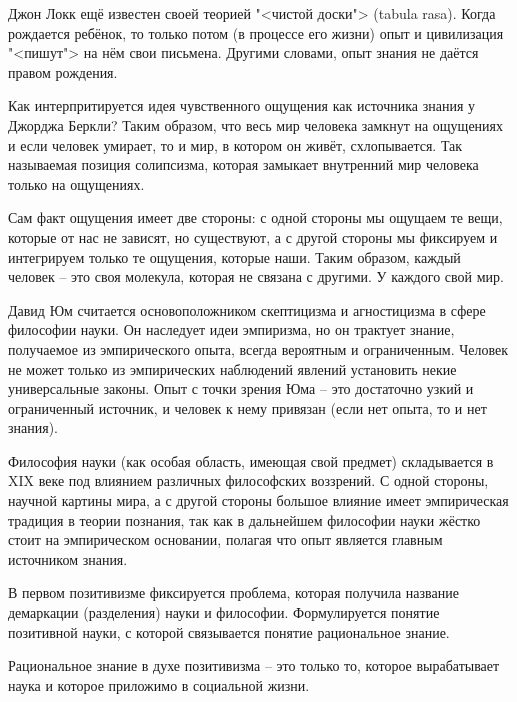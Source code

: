 \documentclass[main.tex]{subfiles}
\begin{document}
Джон Локк ещё известен своей теорией "<чистой доски"> (tabula rasa).
Когда рождается ребёнок, то только потом (в процессе его жизни) опыт и цивилизация "<пишут"> на нём свои письмена.
Другими словами, опыт знания не даётся правом рождения.

Как интерпритируется идея чувственного ощущения как источника знания у Джорджа Беркли?
Таким образом, что весь мир человека замкнут на ощущениях и если человек умирает, то и мир, в котором он живёт, схлопывается.
Так называемая позиция солипсизма, которая замыкает внутренний мир человека только на ощущениях.

Сам факт ощущения имеет две стороны: с одной стороны мы ощущаем те вещи, которые от нас не зависят, но существуют, а с другой стороны мы фиксируем и интегрируем только те ощущения, которые наши.
Таким образом, каждый человек -- это своя молекула, которая не связана с другими.
У каждого свой мир.

Давид Юм считается основоположником скептицизма и агностицизма в сфере философии науки.
Он наследует идеи эмпиризма, но он трактует знание, получаемое из эмпирического опыта, всегда вероятным и ограниченным.
Человек не может только из эмпирических наблюдений явлений установить некие универсальные законы.
Опыт с точки зрения Юма -- это достаточно узкий и ограниченный источник, и человек к нему привязан (если нет опыта, то и нет знания).



Философия науки (как особая область, имеющая свой предмет) складывается в XIX веке под влиянием различных философских воззрений.
С одной стороны, научной картины мира, а с другой стороны большое влияние имеет эмпирическая традиция в теории познания, так как в дальнейшем философии науки жёстко стоит на эмпирическом основании, полагая что опыт является главным источником знания.



В первом позитивизме фиксируется проблема, которая получила название демаркации (разделения) науки и философии.
Формулируется понятие позитивной науки, с которой связывается понятие рациональное знание.

Рациональное знание в духе позитивизма -- это только то, которое вырабатывает наука и которое приложимо в социальной жизни.
\end{document}

